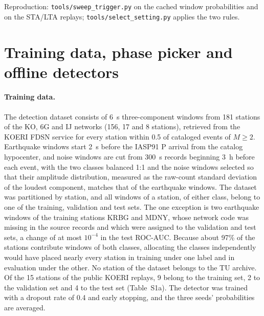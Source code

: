 \documentclass[11pt,a4paper]{article}
\newcommand{\stalta}{STA/LTA}
\newcommand{\tool}[1]{\nolinkurl{#1}}
\begin{document}
\noindent Reproduction: \tool{tools/sweep_trigger.py} on the cached window
probabilities and on the \stalta{} replays; \tool{tools/select_setting.py} applies the
two rules.

\clearpage
\section{Training data, phase picker and offline detectors}\label{s:training}

\paragraph{Training data.} The detection dataset consists of 6~s three-component
windows from 181 stations of the KO, 6G and IJ networks (156, 17 and 8 stations),
retrieved from the KOERI FDSN service for every station within 0.5\textdegree{} of
cataloged events of $M \geq 2$. Earthquake windows start 2~s before the IASP91 P
arrival from the catalog hypocenter, and noise windows are cut from 300~s records
beginning 3~h before each event, with the two classes balanced 1:1 and the noise
windows selected so that their amplitude distribution, measured as the raw-count
standard deviation of the loudest component, matches that of the earthquake windows.
The dataset was partitioned by station, and all windows of a station, of either
class, belong to one of the training, validation and test sets. The one exception is
two earthquake windows of the training stations KRBG and MDNY, whose network code was
missing in the source records and which were assigned to the validation and test
sets, a change of at most $10^{-4}$ in the test ROC-AUC. Because about 97\% of the
stations contribute windows of both classes, allocating the classes independently
would have placed nearly every station in training under one label and in evaluation
under the other. No station of the dataset belongs to the TU archive. Of the 15
stations of the public KOERI replays, 9 belong to the training set, 2 to the
validation set and 4 to the test set (Table~S1a). The detector was trained with a
dropout rate of 0.4 and early stopping, and the three seeds' probabilities are
averaged.
\end{document}
